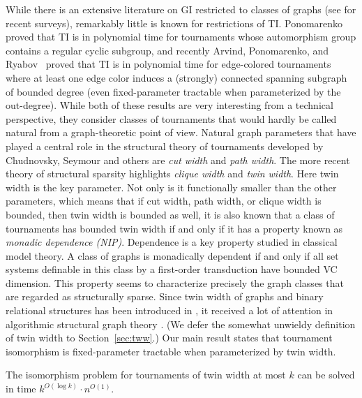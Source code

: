 \documentclass{theoretics}
\begin{document}
While there is an extensive literature on GI restricted to classes of graphs (see \cite{GroheN21,Neuen26} for recent surveys), remarkably little is known for restrictions of TI.
Ponomarenko \cite{Ponomarenko92} proved that TI is in polynomial time for tournaments whose automorphism group contains a regular cyclic subgroup,
and recently Arvind, Ponomarenko, and Ryabov~\cite{ArvindPR25} proved that TI is in polynomial time for edge-colored tournaments where at least one edge color induces a (strongly) connected spanning subgraph of bounded degree (even fixed-parameter tractable when parameterized by the out-degree).
While both of these results are very interesting from a technical perspective, they consider classes of tournaments that would hardly be called natural from a graph-theoretic point of view.
Natural graph parameters that have played a central role in the structural theory of tournaments developed by Chudnovsky, Seymour and others \cite{ChudnovskyFS12,ChudnovskyKLST18,ChudnovskySS19,ChudnovskyS11,FominP19} are \emph{cut width} and \emph{path width}.
The more recent theory of structural sparsity \cite{GajarskyKNMPST20,GajarskyPT22,NesetrilO16,NesetrilMS22} highlights \emph{clique width} and \emph{twin width}.
Here twin width is the key parameter.
Not only is it functionally smaller than the other parameters, which means that if cut width, path width, or clique width is bounded, then twin width is bounded as well, it is also known \cite{GenietT26} that a class of tournaments has bounded twin width if and only if it has a property known as \emph{monadic dependence (NIP)}.
Dependence is a key property studied in classical model theory.
A class of graphs is monadically dependent if and only if all set systems definable in this class by a first-order transduction have bounded VC dimension.
This property seems to characterize precisely the graph classes that are regarded as structurally sparse.
Since twin width of graphs and binary relational structures has been introduced in \cite{BonnetKTW22}, it received a lot of attention in algorithmic structural graph theory
\cite{BonnetGKTW22,BonnetGKTW24,BonnetGMSTT24,BonnetGMT23,BonnetKRT22,BonnetKRTW22,GajarskyPT22,GanianPSSS22,GenietT26,HlinenyJ25,Thomasse22}.
(We defer the somewhat unwieldy definition of twin width to Section~\ref{sec:tww}.)
Our main result states that tournament isomorphism is fixed-parameter tractable when parameterized by twin width.

\begin{theorem}
 \label{thm:tww-isomorphism-intro}
 The isomorphism problem for tournaments of twin width at most $k$ can be solved in time $k^{O(\log k)}\cdot n^{O(1)}$.
\end{theorem}
\end{document}
